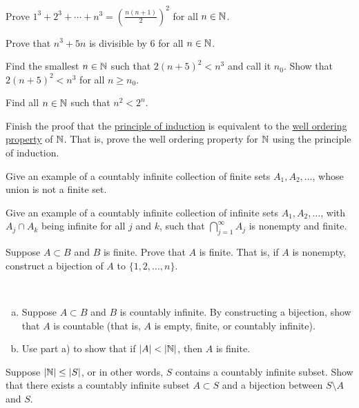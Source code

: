 \begin{exercise}
Prove $1^3 + 2^3 + \cdots + n^3 = {\left( \frac{n(n+1)}{2} \right)}^2$
for all $n \in {\mathbb{N}}$.
\end{exercise}

\begin{exercise}
Prove that $n^3 + 5n$ is divisible by $6$ for all $n \in {\mathbb{N}}$.
\end{exercise}

\begin{exercise}
Find the smallest $n \in {\mathbb{N}}$ such that $2{(n+5)}^2 < n^3$ and call it $n_0$.
Show that $2{(n+5)}^2 < n^3$ for all $n \geq n_0$.
\end{exercise}

\begin{exercise}
Find all $n \in {\mathbb{N}}$ such that $n^2 < 2^n$.
\end{exercise}

\begin{exercise}
Finish the proof that the \hyperref[induction:thm]{principle of induction}
is equivalent to the
\hyperlink{wop:link}{well ordering property} of ${\mathbb{N}}$.  That is,
prove the well ordering property for ${\mathbb{N}}$ using the principle of
induction.
\end{exercise}


\begin{exercise}
Give an example of a countably infinite collection of finite sets $A_1, A_2, \ldots$,
whose union is not a finite set.
\end{exercise}

\begin{exercise}
Give an example of a countably infinite collection of infinite sets $A_1, A_2, \ldots$,
with $A_j \cap A_k$ being infinite for all $j$ and $k$, such that
$\bigcap_{j=1}^\infty A_j$
is nonempty and finite.
\end{exercise}

\begin{exercise}
Suppose $A \subset B$ and $B$ is finite. Prove that $A$ is finite.
That is, if $A$ is nonempty, construct a bijection of $A$ to $\{ 1,2,\ldots,n \}$.
\end{exercise}

\begin{exercise}
{\ }
\begin{enumerate}[a)]
\item
Suppose $A \subset B$ and $B$ is countably infinite.  By constructing a
bijection, show that $A$ is
countable (that is, $A$ is empty, finite, or countably infinite).
\item 
Use part a) to show that if $\left\lvert {A} \right\rvert < \left\lvert {{\mathbb{N}}} \right\rvert$, then $A$ is finite.
\end{enumerate}
\end{exercise}

\begin{exercise}[Challenging] \label{exercise:countsubsetbij}
Suppose $\left\lvert {{\mathbb{N}}} \right\rvert \leq \left\lvert {S} \right\rvert$, or in other words, $S$
contains a countably infinite subset.
Show that there exists a countably infinite subset $A \subset S$ and
a bijection between $S \setminus A$ and $S$.
\end{exercise}
